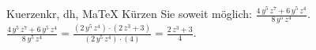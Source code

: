 \begin{MAufgabe}{Kuerzen}{kr, dh, MaTeX}
K\"urzen Sie soweit m\"oglich: $\frac{4\, y^5\, z^7 + 6\, y^5\, z^4}{8\, y^5\, z^4}$.\\ 
\ifLsg\MLoesung
\quad $\frac{4\, y^5\, z^7 + 6\, y^5\, z^4}{8\, y^5\, z^4}=\frac{(2\, y^5\, z^4)\cdot(2\, z^3 + 3)}{(2\, y^5\, z^4)\cdot(4)}=\frac{2\, z^3 + 3}{4}$.\else\relax\fi
 \end{MAufgabe}